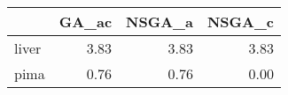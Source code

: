 \begin{tabular}{lrrr}
\toprule
{} &  GA\_ac &  NSGA\_a &  NSGA\_c \\
\midrule
liver &   3.83 &    3.83 &    3.83 \\
pima  &   0.76 &    0.76 &    0.00 \\
\bottomrule
\end{tabular}
